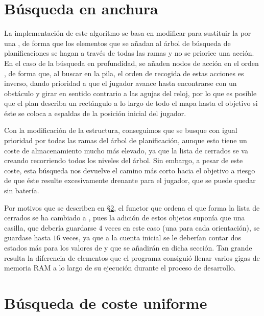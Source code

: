 \section{Búsqueda en anchura}\label{belkan-anchura}

La implementación de este algoritmo se basa en modificar  para sustituir la  por una , de forma que los elementos que se añadan al árbol de búsqueda de planificaciones se hagan a través de todas las ramas y no se priorice una acción.
En el caso de la búsqueda en profundidad, se añaden nodos de acción en el orden , de forma que, al buscar en la pila, el orden de recogida de estas acciones es inverso, dando prioridad a que el jugador avance hasta encontrarse con un obstáculo y girar en sentido contrario a las agujas del reloj, por lo que es posible que el plan describa un rectángulo a lo largo de todo el mapa hasta el objetivo si éste se coloca a espaldas de la posición inicial del jugador.

Con la modificación de la estructura, conseguimos que se busque con igual prioridad por todas las ramas del árbol de planificación, aunque esto tiene un coste de almacenamiento mucho más elevado, ya que la lista de cerrados se va creando recorriendo todos los niveles del árbol.
Sin embargo, a pesar de este coste, esta búsqueda nos devuelve el camino más corto hacia el objetivo a riesgo de que éste resulte excesivamente drenante para el jugador, que se puede quedar sin batería.

Por motivos que se describen en \S\ref{belkan-coste}, el functor que ordena el  que forma la lista de cerrados se ha cambiado a , pues la adición de estos objetos suponía que una casilla, que debería guardarse $4$ veces en este caso (una para cada orientación), se guardase hasta $16$ veces, ya que a la cuenta inicial se le deberían contar dos estados más para los valores de  y  que se añadirán en dicha sección.
Tan grande resulta la diferencia de elementos que el programa consiguió llenar varios gigas de memoria RAM a lo largo de su ejecución durante el proceso de desarrollo.

\section{Búsqueda de coste uniforme}\label{belkan-coste}

